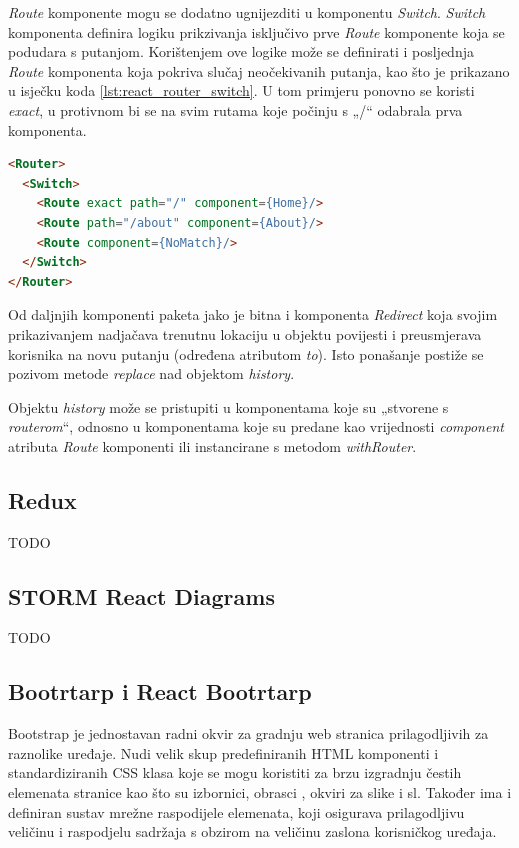 \documentclass[times, utf8, diplomski, numeric]{fer}
\newcommand{\razmakp}{\vspace{18pt}}
\newcommand{\razmaks}{\vspace{10pt}}
\begin{document}
\emph{Route} komponente mogu se dodatno ugnijezditi u komponentu \emph{Switch}.
\emph{Switch} komponenta definira logiku prikzivanja isključivo prve \emph{Route} komponente koja se podudara s putanjom.
Korištenjem ove logike može se definirati i posljednja \emph{Route} komponenta koja pokriva slučaj neočekivanih putanja, kao što je prikazano u isječku koda \ref{lst:react_router_switch}.
U tom primjeru ponovno se koristi \emph{exact}, u protivnom bi se na svim rutama koje počinju s „/“ odabrala prva komponenta.

\razmakp %
\begin{lstlisting}[language=html, caption={Primjer korištenja \emph{Switch}komponente}, label={lst:react_router_switch}]
<Router>
  <Switch>
    <Route exact path="/" component={Home}/>
    <Route path="/about" component={About}/>
    <Route component={NoMatch}/>
  </Switch>
</Router>
\end{lstlisting}
\razmaks

Od daljnjih komponenti paketa jako je bitna i komponenta \emph{Redirect} koja svojim prikazivanjem nadjačava trenutnu lokaciju u objektu povijesti i preusmjerava korisnika na novu putanju (određena atributom \emph{to}).
Isto ponašanje postiže se pozivom metode \emph{replace} nad objektom \emph{history}.

Objektu \emph{history} može se pristupiti u komponentama koje su „stvorene s \emph{routerom}“, odnosno u komponentama koje su predane kao vrijednosti \emph{component} atributa \emph{Route} komponenti ili instancirane s metodom \emph{withRouter}.


\subsection{Redux}

TODO


\subsection{STORM React Diagrams}

TODO


\subsection{Bootrtarp i React Bootrtarp}

Bootstrap je jednostavan radni okvir za gradnju web stranica prilagodljivih za raznolike uređaje.
Nudi velik skup predefiniranih HTML komponenti i standardiziranih CSS klasa koje se mogu koristiti za brzu izgradnju čestih elemenata stranice kao što su izbornici, obrasci , okviri za slike i sl.
Također ima i definiran sustav mrežne raspodijele elemenata, koji osigurava prilagodljivu veličinu i raspodjelu sadržaja s obzirom na veličinu zaslona korisničkog uređaja.
\end{document}
